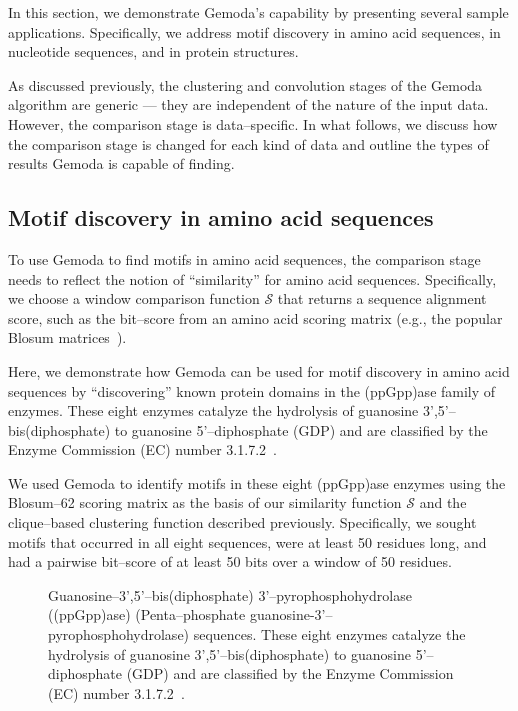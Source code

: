     In this section, we demonstrate Gemoda's capability by presenting
    several sample applications.  Specifically, we address motif discovery
    in
    amino acid sequences, in nucleotide sequences, and in protein structures.

    As discussed previously, the clustering and convolution stages of
    the Gemoda algorithm are generic --- they are independent of the
    nature of the input data.  However, the comparison stage is
    data--specific.  In what follows, we discuss how the comparison stage
    is changed for each kind of data and outline the types of results Gemoda
    is capable of finding.

    \subsection{Motif discovery in amino acid sequences}\label{section:gemoda-aa}

    To use Gemoda to find motifs in amino acid sequences, the
    comparison stage needs to reflect the notion of
    ``similarity'' for amino acid sequences.  Specifically, we choose a
    window comparison function $\mathscr{S}$ that returns
    a sequence alignment score, such as
    the bit--score from an amino acid scoring matrix (e.g., the
    popular Blosum matrices~\citep{henikoff1992aminoacid}).

    Here, we demonstrate how Gemoda can be used
    for motif discovery in amino acid sequences
    by ``discovering'' known protein domains
    in the (ppGpp)ase family of enzymes.
    These eight enzymes catalyze the hydrolysis
    of guanosine 3',5'--bis(diphosphate) to
    guanosine 5'--diphosphate (GDP) and are
    classified by the Enzyme Commission (EC) number
    3.1.7.2~\citep{bairoch2000enzyme}.

    We used Gemoda to identify motifs in these eight
    (ppGpp)ase enzymes using the Blosum--62 scoring
    matrix as the basis of our similarity function
    $\mathscr{S}$ and the clique--based clustering
    function described previously.  Specifically, we
    sought motifs that occurred in all eight sequences,
    were at least 50 residues long, and had a pairwise
    bit--score of at least 50 bits over a window of
    50 residues.

    \begin{figure}[ptb]
        {\tiny
        
        }
        \caption[Guanosine--3',5'--bis(diphosphate)
        3'--pyrophosphohydrolase
        ((ppGpp)ase) (Penta--phosphate
        guanosine-3'--pyrophosphohydrolase)
        sequences]{Guanosine--3',5'--bis(diphosphate)
        3'--pyrophosphohydrolase
        ((ppGpp)ase) (Penta--phosphate
        guanosine-3'--pyrophosphohydrolase)
        sequences.
    These eight enzymes catalyze the hydrolysis
    of guanosine 3',5'--bis(diphosphate) to
    guanosine 5'--diphosphate (GDP) and are
    classified by the Enzyme Commission (EC) number
    3.1.7.2~\cite{bairoch2000enzyme}.
        }\label{fig:ppGppaseSeqs}
    \end{figure}

